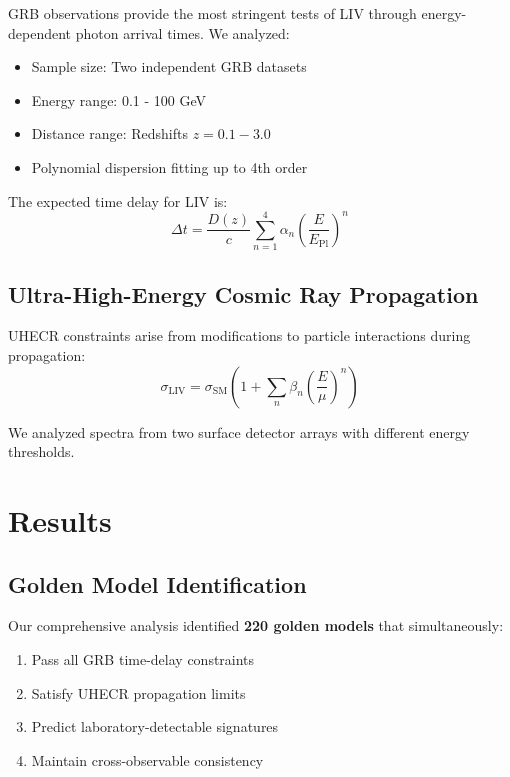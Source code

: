 \documentclass[12pt]{article}
\begin{document}
GRB observations provide the most stringent tests of LIV through energy-dependent photon arrival times. We analyzed:
\begin{itemize}
\item Sample size: Two independent GRB datasets
\item Energy range: 0.1 - 100 GeV
\item Distance range: Redshifts $z = 0.1 - 3.0$
\item Polynomial dispersion fitting up to 4th order
\end{itemize}

The expected time delay for LIV is:
\begin{equation}
\Delta t = \frac{D(z)}{c} \sum_{n=1}^4 \alpha_n \left(\frac{E}{E_{\text{Pl}}}\right)^n
\end{equation}

\subsection{Ultra-High-Energy Cosmic Ray Propagation}

UHECR constraints arise from modifications to particle interactions during propagation:
\begin{equation}
\sigma_{\text{LIV}} = \sigma_{\text{SM}} \left(1 + \sum_n \beta_n \left(\frac{E}{\mu}\right)^n\right)
\end{equation}

We analyzed spectra from two surface detector arrays with different energy thresholds.

\section{Results}

\subsection{Golden Model Identification}

Our comprehensive analysis identified \textbf{220 golden models} that simultaneously:
\begin{enumerate}
\item Pass all GRB time-delay constraints
\item Satisfy UHECR propagation limits  
\item Predict laboratory-detectable signatures
\item Maintain cross-observable consistency
\end{enumerate}
\end{document}
